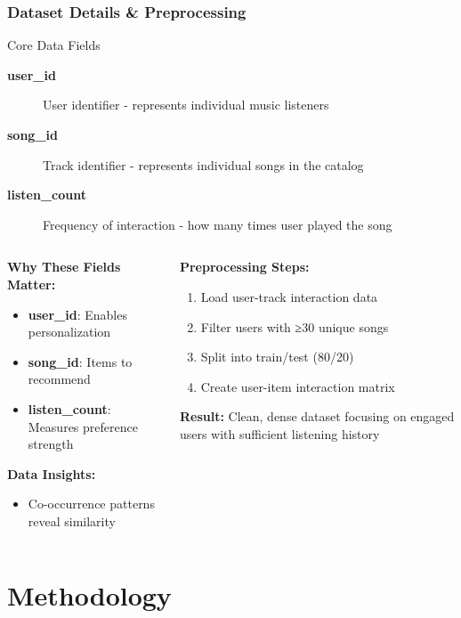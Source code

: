 \documentclass[11pt]{beamer}
\begin{document}
\begin{frame}
\frametitle{Dataset Details \& Preprocessing}
\begin{block}{Core Data Fields}
\begin{description}
\item[\textbf{user\_id}] User identifier - represents individual music listeners
\item[\textbf{song\_id}] Track identifier - represents individual songs in the catalog  
\item[\textbf{listen\_count}] Frequency of interaction - how many times user played the song
\end{description}
\end{block}

\begin{columns}
\begin{column}{0.5\textwidth}
\textbf{Why These Fields Matter:}
\begin{itemize}
\item \textbf{user\_id}: Enables personalization
\item \textbf{song\_id}: Items to recommend
\item \textbf{listen\_count}: Measures preference strength
\end{itemize}

\textbf{Data Insights:}
\begin{itemize}
\item Co-occurrence patterns reveal similarity
\end{itemize}
\end{column}
\begin{column}{0.5\textwidth}
\textbf{Preprocessing Steps:}
\begin{enumerate}
\item Load user-track interaction data
\item Filter users with ≥30 unique songs
\item Split into train/test (80/20)
\item Create user-item interaction matrix
\end{enumerate}

\textbf{Result:}
Clean, dense dataset focusing on engaged users with sufficient listening history
\end{column}
\end{columns}
\end{frame}

\section{Methodology}
\end{document}
